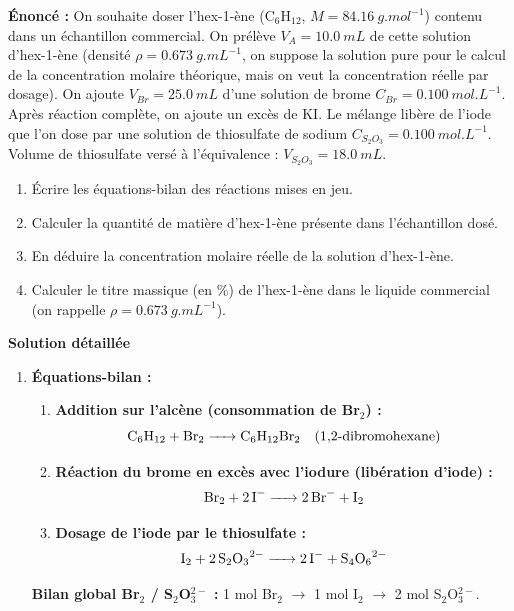 \documentclass[11pt]{article}
\begin{document}
\begin{exoresolu}
\textbf{Énoncé :} On souhaite doser l'hex-1-ène (C$_6$H$_{12}$, $M = \SI{84,16}{g.mol^{-1}}$) contenu dans un échantillon commercial. 
On prélève $V_A = \SI{10,0}{mL}$ de cette solution d'hex-1-ène (densité $\rho = \SI{0,673}{g.mL^{-1}}$, on suppose la solution pure pour le calcul de la concentration molaire théorique, mais on veut la concentration réelle par dosage).
On ajoute $V_{Br} = \SI{25,0}{mL}$ d'une solution de brome $C_{Br} = \SI{0,100}{mol.L^{-1}}$.
Après réaction complète, on ajoute un excès de KI. Le mélange libère de l'iode que l'on dose par une solution de thiosulfate de sodium $C_{S_2O_3} = \SI{0,100}{mol.L^{-1}}$. 
Volume de thiosulfate versé à l'équivalence : $V_{S_2O_3} = \SI{18,0}{mL}$.
\begin{enumerate}
    \item Écrire les équations-bilan des réactions mises en jeu.
    \item Calculer la quantité de matière d'hex-1-ène présente dans l'échantillon dosé.
    \item En déduire la concentration molaire réelle de la solution d'hex-1-ène.
    \item Calculer le titre massique (en \%) de l'hex-1-ène dans le liquide commercial (on rappelle $\rho = \SI{0,673}{g.mL^{-1}}$).
\end{enumerate}

\tcblower
\textbf{Solution détaillée}

\begin{enumerate}
    \item \textbf{Équations-bilan :}
    \begin{enumerate}
        \item \textbf{Addition sur l'alcène (consommation de Br$_2$) :}
        \[ \ce{C6H12 + Br2 -> C6H12Br2} \quad (\text{1,2-dibromohexane}) \]
        \item \textbf{Réaction du brome en excès avec l'iodure (libération d'iode) :}
        \[ \ce{Br2 + 2 I- -> 2 Br- + I2} \]
        \item \textbf{Dosage de l'iode par le thiosulfate :}
        \[ \ce{I2 + 2 S2O3^2- -> 2 I- + S4O6^2-} \]
    \end{enumerate}
    \textbf{Bilan global Br$_2$ / S$_2$O$_3^{2-}$ :} 1 mol Br$_2$ $\rightarrow$ 1 mol I$_2$ $\rightarrow$ 2 mol S$_2$O$_3^{2-}$.


\end{enumerate}
\end{exoresolu}
\end{document}
